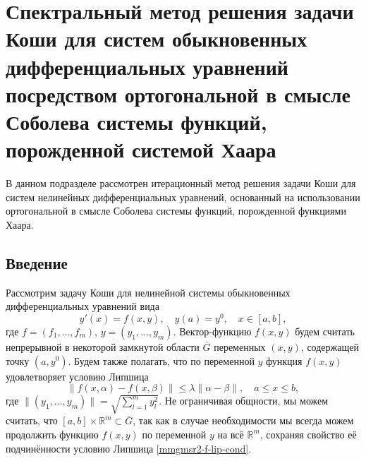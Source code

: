 ﻿\section{Спектральный метод решения задачи Коши для систем обыкновенных дифференциальных уравнений посредством  ортогональной в смысле Соболева системы функций, порожденной системой Хаара}

В данном подразделе рассмотрен итерационный метод решения задачи Коши для систем нелинейных дифференциальных уравнений, основанный на использовании ортогональной в смысле Соболева системы функций, порожденной функциями Хаара.

\subsection{Введение}
\label{mmgmsr2-intro}

Рассмотрим задачу Коши для нелинейной системы обыкновенных дифференциальных уравнений вида
\begin{equation}\label{mmgmsr2-cauchy-problem}
y'(x)=f(x,y), \quad y(a)=y^0, \quad x \in [a,b],
\end{equation}
где $f=(f_1, \ldots, f_m)$, $y=(y_1, \ldots, y_m)$. %
Вектор-функцию $f(x,y)$ будем считать непрерывной в некоторой замкнутой  области $\bar G$ переменных $(x,y)$, содержащей точку $(a,y^0)$.
Будем также полагать, что по переменной $y$ функция $f(x,y)$ удовлетворяет условию Липшица
\begin{equation}\label{mmgmsr2-f-lip-cond}
\|f(x,\alpha)-f(x,\beta)\|\le \lambda\|\alpha-\beta\|,
\quad a \le x \le b,
\end{equation}
где $\|(y_1,\ldots,y_m)\|=\sqrt{\sum_{l=1}^my_l^2}$.
Не ограничивая общности, мы можем считать, что  $[a,b] \times \mathbb{R}^m \subset \bar G$, так как в случае необходимости мы всегда можем продолжить функцию $f(x,y)$ по переменной $y$ на всё $\mathbb{R}^m$, сохраняя свойство её подчинённости условию Липшица \eqref{mmgmsr2-f-lip-cond}.

